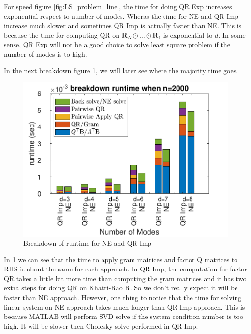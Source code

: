 \documentclass{article}
\newcommand{\mat}[1]{\mathbf{#1}}
\begin{document}
For speed figure \cref{fig:LS_problem_line}, the time for doing QR Exp increases exponential respect to number of modes.
Wheras the time for NE and QR Imp increase much slower and sometimes QR Imp is actually faster than NE.
This is because the time for computing QR on $\mat{R}_N \odot \dots \odot \mat{R}_1$ is exponential to $d$.
In some sense, QR Exp will not be a good choice to solve least square problem if the number of modes is to high.

In the next breakdown figure \cref{fig:LS_problem_breakdown}, we will later see where the majority time goes.
\begin{figure}[ht!]
  \begin{center}
    \includegraphics[scale = 0.8]{breakdown_p.pdf}
    \caption[Figure]{Breakdown of runtime for NE and QR Imp\label{fig:LS_problem_breakdown}}
  \end{center}
\end{figure}

In \cref{fig:LS_problem_breakdown} we can see that the time to apply gram matrices and factor Q matrices to RHS is about the same for each approach.
In QR Imp, the computation for factor QR takes a little bit more time than computing the gram matrices and it has two extra steps for doing QR on Khatri-Rao R.
So we don't really expect it will be faster than NE approach. 
However, one thing to notice that the time for solving linear system on NE approach takes much longer than QR Imp approach.
This is because MATLAB will perform SVD solve if the system condition number is too high.
It will be slower then Cholesky solve performed in QR Imp.
\end{document}
